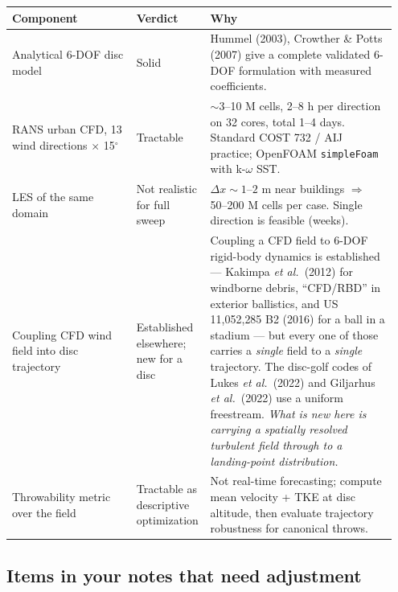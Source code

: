 \begin{center}
\footnotesize
\begin{tabular}{@{}p{0.32\linewidth}p{0.15\linewidth}p{0.48\linewidth}@{}}
\toprule
\textbf{Component} & \textbf{Verdict} & \textbf{Why} \\
\midrule
Analytical 6-DOF disc model & Solid & Hummel (2003), Crowther \& Potts (2007) give a complete validated 6-DOF formulation with measured coefficients. \\
RANS urban CFD, 13 wind directions $\times$ 15$^\circ$ & Tractable & $\sim$3--10 M cells, 2--8 h per direction on 32 cores, total 1--4 days. Standard COST 732 / AIJ practice; OpenFOAM \texttt{simpleFoam} with k-$\omega$ SST. \\
LES of the same domain & Not realistic for full sweep & $\Delta x \sim 1$--$2$ m near buildings $\Rightarrow$ 50--200 M cells per case. Single direction is feasible (weeks). \\
Coupling CFD wind field into disc trajectory & Established elsewhere; new for a disc & %
Coupling a CFD field to 6-DOF rigid-body dynamics is established --- Kakimpa \emph{et al.}\ (2012) for windborne debris, ``CFD/RBD'' in exterior ballistics, and US 11{,}052{,}285 B2 (2016) for a ball in a stadium --- but every one of those carries a \emph{single} field to a \emph{single} trajectory. The disc-golf codes of Lukes \emph{et al.}\ (2022) and Giljarhus \emph{et al.}\ (2022) use a uniform freestream. \emph{What is new here is carrying a spatially resolved turbulent field through to a landing-point distribution.} \\
Throwability metric over the field & Tractable as descriptive optimization & Not real-time forecasting; compute mean velocity + TKE at disc altitude, then evaluate trajectory robustness for canonical throws. \\
\bottomrule
\end{tabular}
\end{center}

\subsection{Items in your notes that need adjustment}

